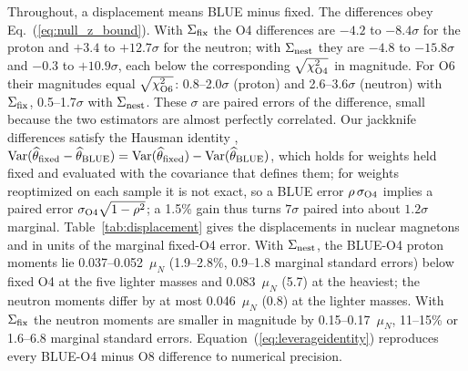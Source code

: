 \documentclass[aps,prd,reprint,twocolumn,superscriptaddress,nofootinbib,longbibliography]{revtex4-2}
\begin{document}
Throughout, a displacement means BLUE minus fixed. The differences obey Eq.~(\ref{eq:null_z_bound}). With $\Sigma_{\rm fix}$ the O4 differences are $-4.2$ to $-8.4\sigma$ for the proton and $+3.4$ to $+12.7\sigma$ for the neutron; with $\Sigma_{\rm nest}$ they are $-4.8$ to $-15.8\sigma$ and $-0.3$ to $+10.9\sigma$, each below the corresponding $\sqrt{\chi^2_{\rm O4}}$ in magnitude. For O6 their magnitudes equal $\sqrt{\chi^2_{\rm O6}}$: 0.8--2.0$\sigma$ (proton) and 2.6--3.6$\sigma$ (neutron) with $\Sigma_{\rm fix}$, 0.5--1.7$\sigma$ with $\Sigma_{\rm nest}$. These $\sigma$ are paired errors of the difference, small because the two estimators are almost perfectly correlated. Our jackknife differences satisfy the Hausman identity \cite{Hausman1978}, ${\rm Var}(\widehat\theta_{\rm fixed}-\widehat\theta_{\rm BLUE})={\rm Var}(\widehat\theta_{\rm fixed})-{\rm Var}(\widehat\theta_{\rm BLUE})$, which holds for weights held fixed and evaluated with the covariance that defines them; for weights reoptimized on each sample it is not exact, so a BLUE error $\rho\,\sigma_{\rm O4}$ implies a paired error $\sigma_{\rm O4}\sqrt{1-\rho^2}$; a 1.5\% gain thus turns $7\sigma$ paired into about $1.2\sigma$ marginal. Table~\ref{tab:displacement} gives the displacements in nuclear magnetons and in units of the marginal fixed-O4 error. With $\Sigma_{\rm nest}$, the BLUE-O4 proton moments lie 0.037--0.052~$\mu_N$ (1.9--2.8\%, 0.9--1.8 marginal standard errors) below fixed O4 at the five lighter masses and 0.083~$\mu_N$ (5.7) at the heaviest; the neutron moments differ by at most 0.046~$\mu_N$ (0.8) at the lighter masses. With $\Sigma_{\rm fix}$ the neutron moments are smaller in magnitude by 0.15--0.17~$\mu_N$, 11--15\% or 1.6--6.8 marginal standard errors. Equation~(\ref{eq:leverageidentity}) reproduces every BLUE-O4 minus O8 difference to numerical precision.
\end{document}
